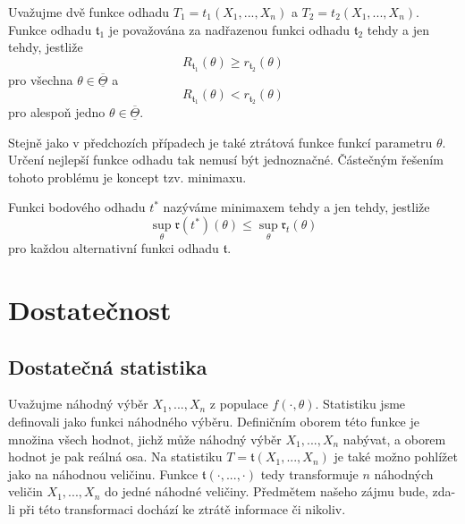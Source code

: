 \begin{definition}
Uvažujme dvě funkce odhadu $T_1 = \mathit{t_1}(X_1, ..., X_n)$ a $T_2 = \mathit{t_2}(X_1, ..., X_n)$. Funkce odhadu $\mathfrak{t}_1$ je považována za nadřazenou funkci odhadu $\mathfrak{t}_2$ tehdy a jen tehdy, jestliže
\begin{equation*}
\mathit{R_{\mathfrak{t}_1}}(\theta) \ge \mathit{r_{\mathfrak{t}_2}}(\theta)
\end{equation*}
pro všechna $\theta \in \overline{\underline{\Theta}}$ a
\begin{equation*}
\mathit{R_{\mathfrak{t}_1}}(\theta) < \mathit{r_{\mathfrak{t}_2}}(\theta)
\end{equation*}
pro alespoň jedno $\theta \in \overline{\underline{\Theta}}$.
\end{definition}

Stejně jako v předchozích případech je také ztrátová funkce funkcí parametru $\theta$. Určení nejlepší funkce odhadu tak nemusí být jednoznačné. Částečným řešením tohoto problému je koncept tzv. minimaxu.

\begin{definition}[Minimax]
Funkci bodového odhadu $t^*$ nazýváme minimaxem tehdy a jen tehdy, jestliže
\begin{equation*}
\sup_{\theta} \mathfrak{r}(t^*)(\theta) \le \sup_{\theta} \mathfrak{r}_t(\theta)
\end{equation*}
pro každou alternativní funkci odhadu $\mathfrak{t}$.
\end{definition}

\section{Dostatečnost}

\subsection{Dostatečná statistika}

Uvažujme náhodný výběr $X_1, ..., X_n$ z populace $f(\cdot, \theta)$. Statistiku jsme definovali jako funkci náhodného výběru. Definičním oborem této funkce je množina všech hodnot, jichž může náhodný výběr $X_1, ..., X_n$ nabývat, a oborem hodnot je pak reálná osa. Na statistiku $T = \mathfrak{t}(X_1, ..., X_n)$ je také možno pohlížet jako na náhodnou veličinu. Funkce $\mathfrak{t}(\cdot, ..., \cdot)$ tedy transformuje $n$ náhodných veličin $X_1, ..., X_n$ do jedné náhodné veličiny. Předmětem našeho zájmu bude, zda-li při této transformaci dochází ke ztrátě informace či nikoliv.

